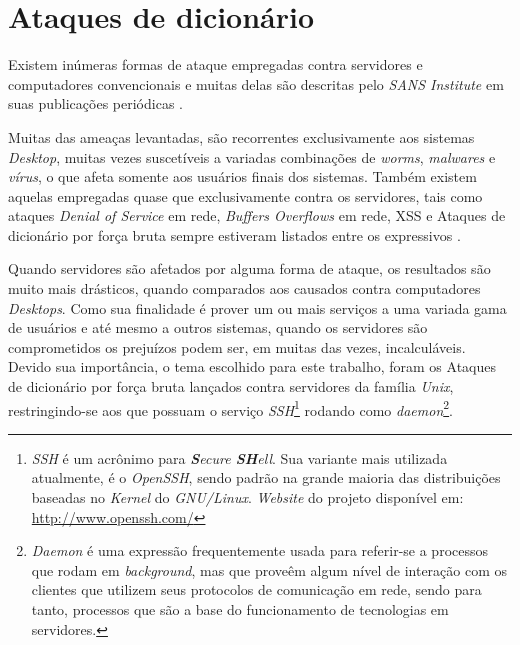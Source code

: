 \chapter{Ataques de dicionário}\label{1_ataques_servidores}

Existem inúmeras formas de ataque empregadas contra servidores e computadores convencionais e muitas delas são descritas pelo \textit{SANS Institute} em suas publicações periódicas \cite{Top20Sans}.

Muitas das ameaças levantadas, são recorrentes exclusivamente aos sistemas \textit{Desktop}, muitas vezes suscetíveis a variadas combinações de \textit{worms}, \textit{malwares} e \textit{vírus}, o que afeta somente aos usuários finais dos sistemas. Também existem aquelas empregadas quase que exclusivamente contra os servidores, tais como ataques \textit{Denial of Service} em rede, \textit{Buffers Overflows} em rede, XSS e Ataques de dicionário por força bruta sempre estiveram listados entre os expressivos \cite{Top10Sans} \cite{Top20Sans}.

Quando servidores são afetados por alguma forma de ataque, os resultados são muito mais drásticos, quando comparados aos causados contra computadores \textit{Desktops}. Como sua finalidade é prover um ou mais serviços a uma variada gama de usuários e até mesmo a outros sistemas, quando os servidores são comprometidos os prejuízos podem ser, em muitas das vezes, incalculáveis. Devido sua importância, o tema escolhido para este trabalho, foram os Ataques de dicionário por força bruta lançados contra servidores da família \textit{Unix}, restringindo-se aos que possuam o serviço \textit{SSH}\footnote{\textit{SSH} é um acrônimo para \textit{\textbf{S}ecure \textbf{SH}ell}. Sua variante mais utilizada atualmente, é o \textit{OpenSSH}, sendo padrão na grande maioria das distribuições baseadas no \textit{Kernel} do \textit{GNU/Linux}. \textit{Website} do projeto disponível em: \url{http://www.openssh.com/}} rodando como \textit{daemon}\footnote{\textit{Daemon} é uma expressão frequentemente usada para referir-se a processos que rodam em \textit{background}, mas que proveêm algum nível de interação com os clientes que utilizem seus protocolos de comunicação em rede, sendo para tanto, processos que são a base do funcionamento de tecnologias em servidores.}.

